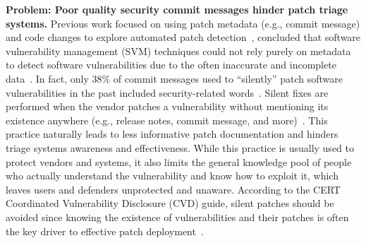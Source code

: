 \textbf{Problem: Poor quality security commit messages hinder patch triage systems.} Previous work focused on using 
patch metadata (e.g., commit message) and code changes 
to explore automated patch detection~\cite{SSPatcher2022,reis2017secbench,9678720,DBLP:journals/corr/abs-1806-05893}, concluded that software vulnerability management (SVM) techniques could not rely purely on metadata to detect software vulnerabilities
due to the often inaccurate and incomplete  data~\cite{DBLP:journals/corr/abs-1806-05893}. In fact, only $38\%$ of commit messages used to ``silently'' patch software vulnerabilities in the past included security-related words~\cite{9678720}. Silent fixes
are performed when the vendor patches a vulnerability  without mentioning its existence anywhere (e.g., release notes, commit message, and more)~\cite{9678720}. This practice naturally leads to less informative patch documentation and hinders triage systems awareness and effectiveness. While this practice is usually used to protect vendors and systems, it
also limits the general knowledge pool of people who actually understand the vulnerability and know how to exploit it, which leaves users and defenders unprotected and unaware. According to the CERT Coordinated Vulnerability Disclosure (CVD) guide, silent patches should be avoided since knowing the existence of vulnerabilities and their patches is often the key driver to effective patch deployment~\cite{Householder2020}. 



